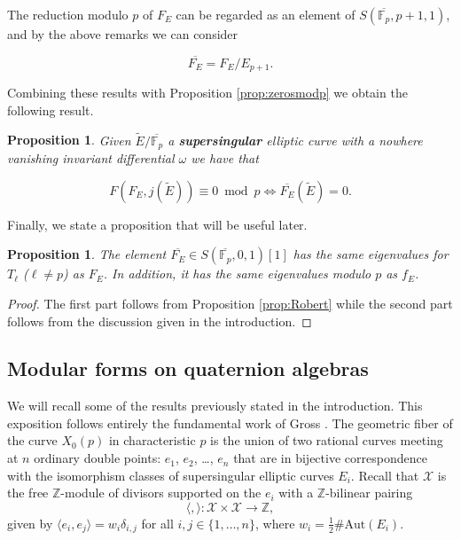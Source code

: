 \documentclass[13pt]{amsart}
\newtheorem{proposition}[theorem]{Proposition}
\theoremstyle{remark}
\numberwithin{theorem}{section} \numberwithin{equation}{section}
\begin{document}
The reduction modulo $p$ of $F_{E}$ can be regarded as an element of 
${S}(\overline{\mathbb{F}_p},p+1,1)$, and by the above remarks we can consider

\[ \overline{F_{E}}= F_{E}/E_{p+1} .\]

Combining these results with Proposition \ref{prop:zerosmodp}  we obtain the 
following result.

\begin{proposition} \label{prop:zerosmodp2}
Given $\tilde{E}/\overline{\mathbb{F}_p}$ a \textbf{supersingular}  elliptic curve with a nowhere vanishing invariant differential $\omega$ we have that
 
 \[ F(F_{E},j(\tilde{E})) \equiv 0 \bmod{p}  \iff \overline{F_{E}}( \tilde{E})= 0 .\]
\end{proposition}

Finally, we state a proposition that will be useful later.

\begin{proposition} \label{prop:eigmodp}
 The element $\overline{F_{E}} \in {S}(\overline{\mathbb{F}_p},0,1)[1]$ has the same 
eigenvalues for $T_{\ell}$ ($\ell \neq p$) as $F_{E}$. In addition,
 it has the same eigenvalues modulo $p$ as $f_{E}$.
\end{proposition}

\begin{proof}
The first part follows from  Proposition \ref{prop:Robert} while the second part 
follows from the discussion given in the introduction.

\end{proof}
\subsection{Modular forms on quaternion algebras}
We will recall some of the results previously stated in the introduction. This exposition follows entirely the fundamental work of Gross \cite{Gross}.
The geometric fiber of the curve $X_0(p)$ in characteristic $p$ is the union of two rational curves meeting at $n$ ordinary double points: $e_1$, $e_2$, \ldots, $e_{n}$ that are in bijective correspondence with the isomorphism classes of supersingular elliptic curves $E_i$.
 Recall that ${\mathcal{X}}$ is the free ${\mathbb{Z}}$-module of divisors supported on the $e_i$ with a ${\mathbb{Z}}$-bilinear pairing 
\[
\langle,\rangle:{\mathcal{X}}\times{\mathcal{X}} \rightarrow {\mathbb{Z}},
\]
given by $\langle e_i,e_j \rangle=w_i \delta_{i,j}$ for all $i,j \in \{1,\ldots,n \}$,
where $w_{i}=\frac{1}{2}\#\textrm{Aut}(E_i)$.
\end{document}
